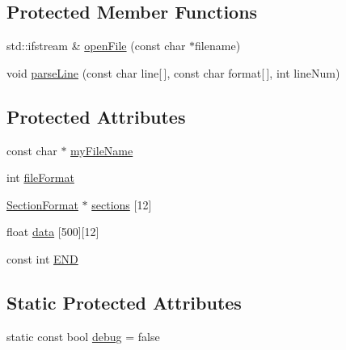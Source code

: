 \subsection*{Protected Member Functions}
\begin{DoxyCompactItemize}
\item 
std\-::ifstream \& \hyperlink{classsvl_c_c_file_i_o_ad1912b57d81be543cd69a6c2c1278cd4}{open\-File} (const char $\ast$filename)
\item 
void \hyperlink{classsvl_c_c_file_i_o_a1892391e2070499d161f10dd92a77132}{parse\-Line} (const char line\mbox{[}$\,$\mbox{]}, const char format\mbox{[}$\,$\mbox{]}, int line\-Num)
\end{DoxyCompactItemize}
\subsection*{Protected Attributes}
\begin{DoxyCompactItemize}
\item 
const char $\ast$ \hyperlink{classsvl_c_c_file_i_o_a35c21bfeb403f11edeaa3cfe840bc131}{my\-File\-Name}
\item 
int \hyperlink{classsvl_c_c_file_i_o_a909643473f103610ef3e3c2f6cc8ab36}{file\-Format}
\item 
\hyperlink{classsvl_c_c_file_i_o_1_1_section_format}{Section\-Format} $\ast$ \hyperlink{classsvl_c_c_file_i_o_a23a716f9d66619a4d6dd8bca942a10e0}{sections} \mbox{[}12\mbox{]}
\item 
float \hyperlink{classsvl_c_c_file_i_o_ae844c345ae4a600c08c10a4f0bfe19db}{data} \mbox{[}500\mbox{]}\mbox{[}12\mbox{]}
\item 
const int \hyperlink{classsvl_c_c_file_i_o_a1684202309d50da31b40dbba082117ff}{E\-N\-D}
\end{DoxyCompactItemize}
\subsection*{Static Protected Attributes}
\begin{DoxyCompactItemize}
\item 
static const bool \hyperlink{classsvl_c_c_file_i_o_ad0cf392aff766cccdce3cdc84bd7fd0e}{debug} = false
\end{DoxyCompactItemize}


